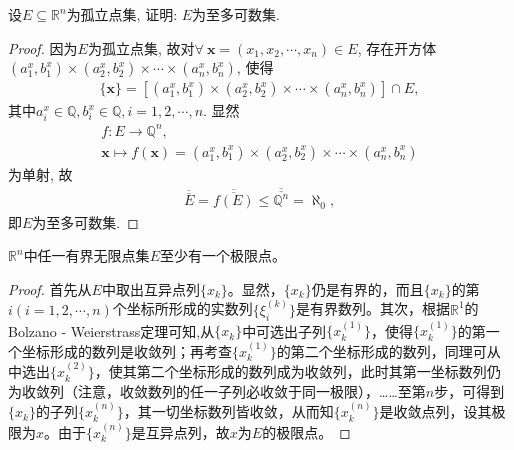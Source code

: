 \documentclass[../../main.tex]{subfiles}%
\begin{document}
\begin{proposition}
设$E \subseteq \mathbb{R}^n$为孤立点集, 证明: $E$为至多可数集.
\end{proposition}
\begin{proof}
因为$E$为孤立点集, 故对$\forall\ \boldsymbol{x}=(x_1,x_2,\cdots,x_n) \in E$, 存在开方体$(a_1^x,b_1^x) \times (a_2^x,b_2^x) \times \cdots \times (a_n^x,b_n^x)$, 使得
\begin{align*}
\{\boldsymbol{x}\} = \left[ (a_1^x,b_1^x) \times (a_2^x,b_2^x) \times \cdots \times (a_n^x,b_n^x) \right] \cap E,
\end{align*}
其中$a_i^x \in \mathbb{Q}, b_i^x \in \mathbb{Q}, i=1,2,\cdots,n.$ 显然
\begin{gather*}
f: E \to \mathbb{Q}^n, \\
\boldsymbol{x} \mapsto f(\boldsymbol{x}) = (a_1^x,b_1^x) \times (a_2^x,b_2^x) \times \cdots \times (a_n^x,b_n^x)
\end{gather*}
为单射, 故
\begin{align*}
\overline{\overline{E}} = \overline{\overline{f(E)}} \leqslant \overline{\overline{\mathbb{Q}^n}} = \aleph_0,
\end{align*}
即$E$为至多可数集.
\end{proof}

\begin{theorem}\label{theorem:R^n中的Bolzano--Weierstrass定理}
\(\mathbb{R}^n\)中任一有界无限点集\(E\)至少有一个极限点。
\end{theorem}
\begin{proof}
首先从\(E\)中取出互异点列\(\{x_k\}\)。显然，\(\{x_k\}\)仍是有界的，而且\(\{x_k\}\)的第\(i(i = 1,2,\cdots,n)\)个坐标所形成的实数列\(\{\xi_i^{(k)}\}\)是有界数列。其次，根据\(\mathbb{R}^1\)的Bolzano - Weierstrass定理可知,从\(\{x_k\}\)中可选出子列\(\{x_k^{(1)}\}\)，使得\(\{x_k^{(1)}\}\)的第一个坐标形成的数列是收敛列；再考查\(\{x_k^{(1)}\}\)的第二个坐标形成的数列，同理可从中选出\(\{x_k^{(2)}\}\)，使其第二个坐标形成的数列成为收敛列，此时其第一坐标数列仍为收敛列（注意，收敛数列的任一子列必收敛于同一极限），……至第\(n\)步，可得到\(\{x_k\}\)的子列\(\{x_k^{(n)}\}\)，其一切坐标数列皆收敛，从而知\(\{x_k^{(n)}\}\)是收敛点列，设其极限为\(x\)。由于\(\{x_k^{(n)}\}\)是互异点列，故\(x\)为\(E\)的极限点。
\end{proof}
\end{document}
